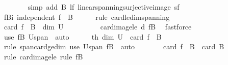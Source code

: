 \begin{isabellebody}
\ \ \ \ \ \ \isamarkupfalse%
\ {\isacharparenleft}{\kern0pt}simp\ add{\isacharcolon}{\kern0pt}\ B{\isacharparenleft}{\kern0pt}{}{\isacharparenright}{\kern0pt}\ lf\ linear{\isacharunderscore}{\kern0pt}spanning{\isacharunderscore}{\kern0pt}surjective{\isacharunderscore}{\kern0pt}image\ sf{\isacharparenright}{\kern0pt}\isanewline
\ \ \ \ \isamarkupfalse%
\ fBi{\isacharcolon}{\kern0pt}\ {\isachardoublequoteopen}independent\ {\isacharparenleft}{\kern0pt}f\ {\isacharbackquote}{\kern0pt}\ B{\isacharparenright}{\kern0pt}{\isachardoublequoteclose}\isanewline
\ \ \ \ \isamarkupfalse%
\ {\isacharparenleft}{\kern0pt}rule\ card{\isacharunderscore}{\kern0pt}le{\isacharunderscore}{\kern0pt}dim{\isacharunderscore}{\kern0pt}spanning{\isacharparenright}{\kern0pt}\isanewline
\ \ \ \ \ \ \isamarkupfalse%
\ {\isachardoublequoteopen}card\ {\isacharparenleft}{\kern0pt}f\ {\isacharbackquote}{\kern0pt}\ B{\isacharparenright}{\kern0pt}\ {\isasymle}\ dim\ {\isacharquery}{\kern0pt}U{\isachardoublequoteclose}\isanewline
\ \ \ \ \ \ \ \ \isamarkupfalse%
\ card{\isacharunderscore}{\kern0pt}image{\isacharunderscore}{\kern0pt}le\ d\ fB\ \isamarkupfalse%
\ fastforce\isanewline
\ \ \ \ \isamarkupfalse%
\ {\isacharparenleft}{\kern0pt}use\ fB\ Uspan\ \ auto{\isacharparenright}{\kern0pt}\isanewline
\ \ \ \ \isamarkupfalse%
\ th{}{\isacharcolon}{\kern0pt}\ {\isachardoublequoteopen}dim\ {\isacharquery}{\kern0pt}U\ {\isasymle}\ card\ {\isacharparenleft}{\kern0pt}f\ {\isacharbackquote}{\kern0pt}\ B{\isacharparenright}{\kern0pt}{\isachardoublequoteclose}\isanewline
\ \ \ \ \ \ \isamarkupfalse%
\ {\isacharparenleft}{\kern0pt}rule\ span{\isacharunderscore}{\kern0pt}card{\isacharunderscore}{\kern0pt}ge{\isacharunderscore}{\kern0pt}dim{\isacharparenright}{\kern0pt}\ {\isacharparenleft}{\kern0pt}use\ Uspan\ fB\ \ auto{\isacharparenright}{\kern0pt}\isanewline
\ \ \ \ \isamarkupfalse%
\ \isamarkupfalse%
\ {\isachardoublequoteopen}card\ {\isacharparenleft}{\kern0pt}f\ {\isacharbackquote}{\kern0pt}\ B{\isacharparenright}{\kern0pt}\ {\isasymle}\ card\ B{\isachardoublequoteclose}\isanewline
\ \ \ \ \ \ \isamarkupfalse%
\ {\isacharparenleft}{\kern0pt}rule\ card{\isacharunderscore}{\kern0pt}image{\isacharunderscore}{\kern0pt}le{\isacharcomma}{\kern0pt}\ rule\ fB{\isacharparenright}{\kern0pt}\isanewline
\ \ \ \ \isamarkupfalse%
\ \isamarkupfalse%

\end{isabellebody}
